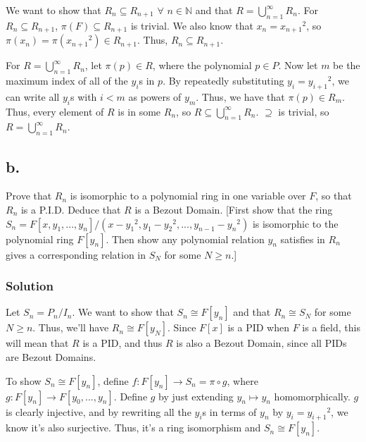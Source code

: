 \documentclass[fleqn]{article}
\begin{document}
            We want to show that $R_n \subseteq R_{n + 1}$ $\forall$ $n \in \mathbb{N}$ and that $R = \bigcup\limits_{n = 1}^{\infty} R_n$.  For $R_n \subseteq R_{n + 1}$, $\pi(F) \subseteq R_{n + 1}$ is trivial.  We also know that $x_n = {x_{n + 1}}^2$, so $\pi(x_n) = \pi\left({x_{n + 1}}^2\right) \in R_{n + 1}$.  Thus, $R_n \subseteq R_{n + 1}$.
            
            For $R = \bigcup\limits_{n = 1}^{\infty} R_n$, let $\pi(p) \in R$, where the polynomial $p \in P$.  Now let $m$ be the maximum index of all of the $y_i$s in $p$.  By repeatedly substituting $y_i = {y_{i + 1}}^2$, we can write all $y_i$s with $i < m$ as powers of $y_m$.  Thus, we have that $\pi(p) \in R_m$.  Thus, every element of $R$ is in some $R_n$, so $R \subseteq \bigcup\limits_{n = 1}^{\infty} R_n$.  $\supseteq$ is trivial, so $R = \bigcup\limits_{n = 1}^{\infty} R_n$.
        
        \subsection{b.}
        Prove that $R_n$ is isomorphic to a polynomial ring in one variable over $F$, so that $R_n$ is a P.I.D.  Deduce that $R$ is a Bezout Domain.  [First show that the ring $S_n = F[x, y_1, ..., y_n]/\left(x - {y_1}^2, y_1 - {y_2}^2, ..., y_{n - 1} - {y_n}^2\right)$ is isomorphic to the polynomial ring $F[y_n]$.  Then show any polynomial relation $y_n$ satisfies in $R_n$ gives a corresponding relation in $S_N$ for some $N \geq n$.]
            
            \subsubsection{Solution}
            Let $S_n = P_n/I_n$.  We want to show that $S_n \cong F[y_n]$ and that $R_n \cong S_N$ for some $N \geq n$.  Thus, we'll have $R_n \cong F[y_N]$.  Since $F[x]$ is a PID when $F$ is a field, this will mean that $R$ is a PID, and thus $R$ is also a Bezout Domain, since all PIDs are Bezout Domains.
            
            To show $S_n \cong F[y_n]$, define $f: F[y_n] \to S_n = \pi \circ g$, where $g: F[y_n] \to F[y_0, ..., y_n]$.  Define $g$ by just extending $y_n \mapsto y_n$ homomorphically.  $g$ is clearly injective, and by rewriting all the $y_i$s in terms of $y_n$ by $y_i = {y_{i + 1}}^2$, we know it's also surjective.  Thus, it's a ring isomorphism and $S_n \cong F[y_n]$.
            
\end{document}
